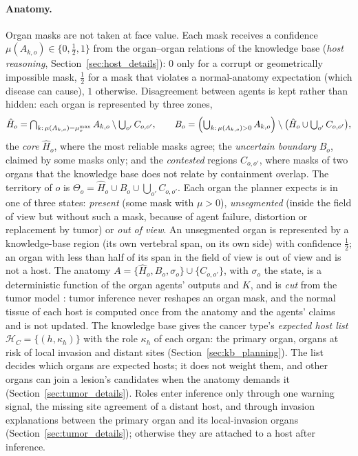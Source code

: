 \documentclass[fleqn,10pt]{olplainarticle}
\begin{document}
\paragraph{Anatomy.}
Organ masks are not taken at face value. Each mask receives a confidence $\mu(A_{k,o})\in\{0,\tfrac12,1\}$ from the
organ--organ relations of the knowledge base (\emph{host reasoning}, Section~\ref{sec:host_details}): $0$ only for a corrupt or geometrically
impossible mask, $\tfrac12$ for a mask that violates a normal-anatomy expectation (which disease can cause), $1$
otherwise. Disagreement between agents is kept rather than hidden: each organ is represented by three zones,
\begin{equation}
\label{eq:organ_reference}
\hat H_o=\textstyle\bigcap_{k:\,\mu(A_{k,o})=\mu^{\max}_o}A_{k,o}\setminus\bigcup_{o'}C_{o,o'},\qquad
B_o=\Bigl(\textstyle\bigcup_{k:\,\mu(A_{k,o})>0}A_{k,o}\Bigr)\setminus\bigl(\hat H_o\cup\textstyle\bigcup_{o'}C_{o,o'}\bigr),
\end{equation}
the \emph{core} $\hat H_o$, where the most reliable masks agree; the \emph{uncertain boundary} $B_o$, claimed by some
masks only; and the \emph{contested} regions $C_{o,o'}$, where masks of two organs that the knowledge base does not relate
by containment overlap. The territory of $o$ is $\Theta_o=\hat H_o\cup B_o\cup\bigcup_{o'}C_{o,o'}$. Each organ the
planner expects is in one of three states: \emph{present} (some mask with $\mu>0$), \emph{unsegmented} (inside the field
of view but without such a mask, because of agent failure, distortion or replacement by tumor) or \emph{out of view}. An
unsegmented organ is represented by a knowledge-base region (its own vertebral span, on its own side) with confidence
$\tfrac12$; an organ with less than half of its span in the field of view is out of view and is not a host. The anatomy $A=\{\hat H_o,B_o,\sigma_o\}\cup\{C_{o,o'}\}$, with $\sigma_o$ the
state, is a deterministic function of the organ agents' outputs and $K$, and is \emph{cut} from the tumor model
\cite{liu2009modularization,plummer2015cuts,jacob2017better}: tumor inference never reshapes an organ mask, and the normal
tissue of each host is computed once from the anatomy and the agents' claims and is not updated. The knowledge base
gives the cancer type's \emph{expected host list} $\mathcal{H}_C=\{(h,\kappa_h)\}$ with the role $\kappa_h$ of each
organ: the primary organ, organs at risk of local invasion and distant sites (Section~\ref{sec:kb_planning}). The list
decides which organs are expected hosts; it does not weight them, and other organs can join a lesion's candidates when the
anatomy demands it (Section~\ref{sec:tumor_details}). Roles enter inference only through one warning signal, the missing
site agreement of a distant host, and through invasion explanations between the primary organ and its local-invasion
organs (Section~\ref{sec:tumor_details}); otherwise they are attached to a host after inference.
\end{document}
